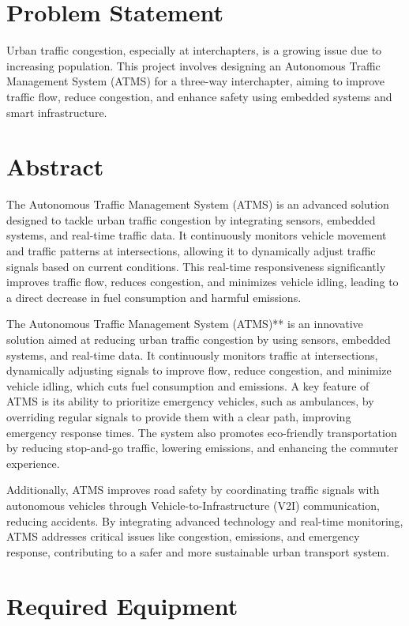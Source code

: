 \documentclass{scrreprt}
\begin{document}
\section*{Problem Statement}
Urban traffic congestion, especially at interchapters, is a growing issue due to increasing population. This project involves designing an Autonomous Traffic Management System (ATMS) for a three-way interchapter, aiming to improve traffic flow, reduce congestion, and enhance safety using embedded systems and smart infrastructure.

\section*{Abstract}
The Autonomous Traffic Management System (ATMS) is an advanced solution designed to tackle urban traffic congestion by integrating sensors, embedded systems, and real-time traffic data. It continuously monitors vehicle movement and traffic patterns at intersections, allowing it to dynamically adjust traffic signals based on current conditions. This real-time responsiveness significantly improves traffic flow, reduces congestion, and minimizes vehicle idling, leading to a direct decrease in fuel consumption and harmful emissions.

The Autonomous Traffic Management System (ATMS)** is an innovative solution aimed at reducing urban traffic congestion by using sensors, embedded systems, and real-time data. It continuously monitors traffic at intersections, dynamically adjusting signals to improve flow, reduce congestion, and minimize vehicle idling, which cuts fuel consumption and emissions.
A key feature of ATMS is its ability to prioritize emergency vehicles, such as ambulances, by overriding regular signals to provide them with a clear path, improving emergency response times. The system also promotes eco-friendly transportation by reducing stop-and-go traffic, lowering emissions, and enhancing the commuter experience.

Additionally, ATMS improves road safety by coordinating traffic signals with autonomous vehicles through Vehicle-to-Infrastructure (V2I) communication, reducing accidents. By integrating advanced technology and real-time monitoring, ATMS addresses critical issues like congestion, emissions, and emergency response, contributing to a safer and more sustainable urban transport system.
\section*{Required Equipment}
\end{document}
